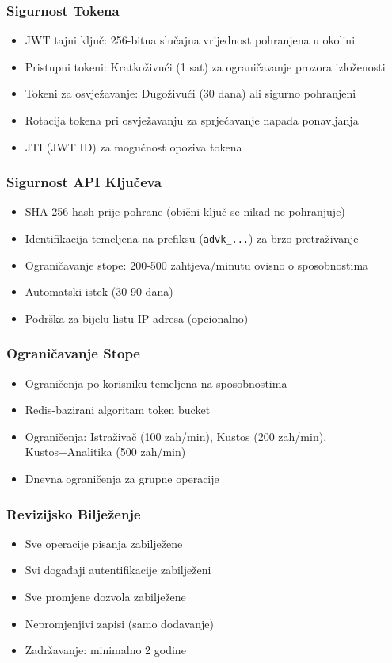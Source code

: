 \documentclass[12pt,a4paper]{article}
\begin{document}
\subsubsection{Sigurnost Tokena}
\begin{itemize}
    \item JWT tajni ključ: 256-bitna slučajna vrijednost pohranjena u okolini
    \item Pristupni tokeni: Kratkoživući (1 sat) za ograničavanje prozora izloženosti
    \item Tokeni za osvježavanje: Dugoživući (30 dana) ali sigurno pohranjeni
    \item Rotacija tokena pri osvježavanju za sprječavanje napada ponavljanja
    \item JTI (JWT ID) za mogućnost opoziva tokena
\end{itemize}

\subsubsection{Sigurnost API Ključeva}
\begin{itemize}
    \item SHA-256 hash prije pohrane (obični ključ se nikad ne pohranjuje)
    \item Identifikacija temeljena na prefiksu (\texttt{advk\_...}) za brzo pretraživanje
    \item Ograničavanje stope: 200-500 zahtjeva/minutu ovisno o sposobnostima
    \item Automatski istek (30-90 dana)
    \item Podrška za bijelu listu IP adresa (opcionalno)
\end{itemize}

\subsubsection{Ograničavanje Stope}
\begin{itemize}
    \item Ograničenja po korisniku temeljena na sposobnostima
    \item Redis-bazirani algoritam token bucket
    \item Ograničenja: Istraživač (100 zah/min), Kustos (200 zah/min), Kustos+Analitika (500 zah/min)
    \item Dnevna ograničenja za grupne operacije
\end{itemize}

\subsubsection{Revizijsko Bilježenje}
\begin{itemize}
    \item Sve operacije pisanja zabilježene
    \item Svi događaji autentifikacije zabilježeni
    \item Sve promjene dozvola zabilježene
    \item Nepromjenjivi zapisi (samo dodavanje)
    \item Zadržavanje: minimalno 2 godine
\end{itemize}
\end{document}
